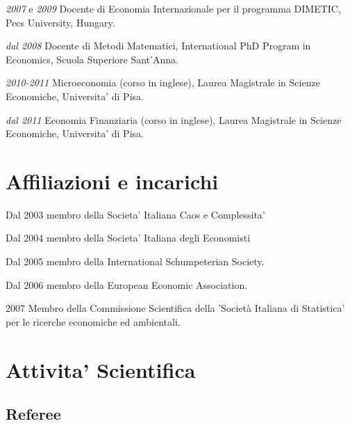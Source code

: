 \documentclass[a4paper]{article}
\begin{document}
\emph{2007} e \emph{2009} Docente di Economia Internazionale per il programma
DIMETIC, Pecs University, Hungary.

\emph{dal 2008} Docente di Metodi Matematici, International PhD Program in
Economics, Scuola Superiore Sant'Anna.

\emph{2010-2011} Microeconomia (corso in inglese), Laurea Magistrale in
Scienze Economiche, Universita' di Pisa.

\emph{dal 2011} Economia Finanziaria (corso in inglese), Laurea Magistrale
in Scienze Economiche, Universita' di Pisa.


\section{Affiliazioni e incarichi%
  \label{affiliazioni-e-incarichi}%
}

Dal 2003 membro della Societa' Italiana Caos e Complessita'

Dal 2004 membro della Societa' Italiana degli Economisti

Dal 2005 membro della International Schumpeterian Society.

Dal 2006 membro della European Economic Association.

2007 Membro della Commissione Scientifica della 'Società Italiana di
Statistica' per le ricerche economiche ed ambientali.


\section{Attivita' Scientifica%
  \label{attivita-scientifica}%
}


\subsection{Referee%
  \label{referee}%
}
\end{document}
